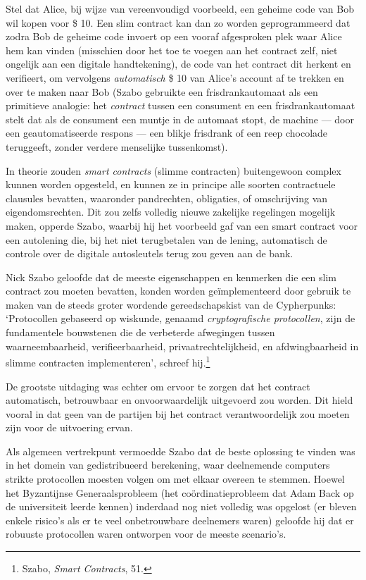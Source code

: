 \documentclass[
  a5paper,
  smalldemyvopaper,11pt,twoside,onecolumn,openright,extrafontsizes,
hidelinks]{memoir}
\begin{document}
Stel dat Alice, bij wijze van vereenvoudigd voorbeeld, een geheime code
van Bob wil kopen voor \$ 10. Een slim contract kan dan zo worden
geprogrammeerd dat zodra Bob de geheime code invoert op een vooraf
afgesproken plek waar Alice hem kan vinden (misschien door het toe te
voegen aan het contract zelf, niet ongelijk aan een digitale
handtekening), de code van het contract dit herkent en verifieert, om
vervolgens \emph{automatisch} \$ 10 van Alice's account af te trekken en
over te maken naar Bob (Szabo gebruikte een frisdrankautomaat als een
primitieve analogie: het \emph{contract} tussen een consument en een
frisdrankautomaat stelt dat als de consument een muntje in de automaat
stopt, de machine --- door een geautomatiseerde respons --- een blikje
frisdrank of een reep chocolade teruggeeft, zonder verdere menselijke
tussenkomst).

In theorie zouden \emph{smart contracts} (slimme contracten)
buitengewoon complex kunnen worden opgesteld, en kunnen ze in principe
alle soorten contractuele clausules bevatten, waaronder pandrechten,
obligaties, of omschrijving van eigendomsrechten. Dit zou zelfs volledig
nieuwe zakelijke regelingen mogelijk maken, opperde Szabo, waarbij hij
het voorbeeld gaf van een smart contract voor een autolening die, bij
het niet terugbetalen van de lening, automatisch de controle over de
digitale autosleutels terug zou geven aan de bank.

Nick Szabo geloofde dat de meeste eigenschappen en kenmerken die een
slim contract zou moeten bevatten, konden worden geïmplementeerd door
gebruik te maken van de steeds groter wordende gereedschapskist van de
Cypherpunks: `Protocollen gebaseerd op wiskunde, genaamd
\emph{cryptografische protocollen}, zijn de fundamentele bouwstenen die
de verbeterde afwegingen tussen waarneembaarheid, verifieerbaarheid,
privaatrechtelijkheid, en afdwingbaarheid in slimme contracten
implementeren', schreef hij.\footnote{Szabo, \emph{Smart Contracts}, 51.}

De grootste uitdaging was echter om ervoor te zorgen dat het contract
automatisch, betrouwbaar en onvoorwaardelijk uitgevoerd zou worden. Dit
hield vooral in dat geen van de partijen bij het contract
verantwoordelijk zou moeten zijn voor de uitvoering ervan.

Als algemeen vertrekpunt vermoedde Szabo dat de beste oplossing te
vinden was in het domein van gedistribueerd berekening, waar deelnemende
computers strikte protocollen moesten volgen om met elkaar overeen te
stemmen. Hoewel het Byzantijnse Generaalsprobleem (het
coördinatieprobleem dat Adam Back op de universiteit leerde kennen)
inderdaad nog niet volledig was opgelost (er bleven enkele risico's als
er te veel onbetrouwbare deelnemers waren) geloofde hij dat er robuuste
protocollen waren ontworpen voor de meeste scenario's.
\end{document}
